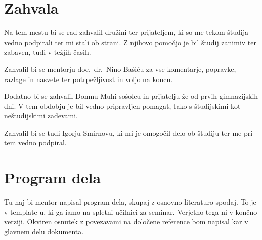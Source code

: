 \documentclass[12pt,a4paper,twoside]{article}
\theoremstyle{definition} %
\theoremstyle{plain} %
\numberwithin{equation}{section}  %
\renewcommand{\listfigurename}{Kazalo slik}%
\begin{document}
%
%
%
%
%

\section*{Zahvala}
Na tem mestu bi se rad zahvalil družini ter prijateljem, ki so me tekom študija vedno podpirali ter mi stali ob strani. Z njihovo pomočjo je bil študij zanimiv ter zabaven, tudi v težjih časih.

Zahvalil bi se mentorju doc.~dr.~Nino Bašiću za vse komentarje, popravke, razlage in nasvete ter potrpežljivost in voljo na koncu.

Dodatno bi se zahvalil Domnu Muhi sošolcu in prijatelju že od prvih gimnazijskih dni. V tem obdobju je bil vedno pripravljen pomagat, tako s študijskimi kot neštudijskimi zadevami.

Zahvalil bi se tudi Igorju Smirnovu, ki mi je omogočil delo ob študiju ter me pri tem vedno podpiral.

\cleardoublepage

\tableofcontents


\cleardoublepage

\section*{Program dela}
Tu naj bi mentor napisal program dela, skupaj z osnovno literaturo spodaj. To je v template-u, ki ga iamo na spletni učilnici za seminar. Verjetno tega ni v končno verziji. Okviren osnutek z povezavami na določene reference bom napisal kar v glavnem delu dokumenta.
\end{document}
